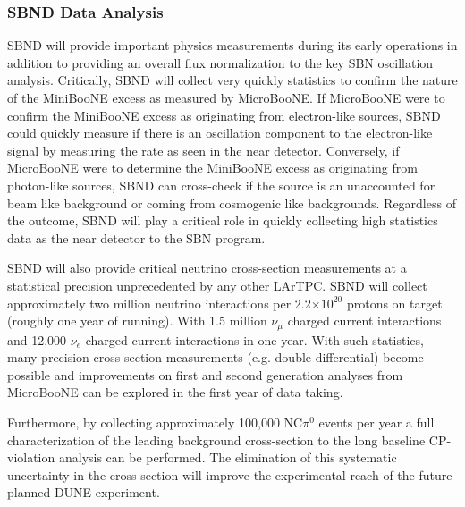 \subsubsection{SBND Data Analysis}\label{sec:SBNDBulid}
SBND will provide important physics measurements during its early operations in addition to providing an overall flux normalization to the key SBN oscillation analysis. Critically, SBND will collect very quickly statistics to confirm the nature of the MiniBooNE excess as measured by MicroBooNE. If MicroBooNE were to confirm the MiniBooNE excess as originating from electron-like sources, SBND could quickly measure if there is an oscillation component to the electron-like signal by measuring the rate as seen in the near detector. Conversely, if MicroBooNE were to determine the MiniBooNE excess as originating from photon-like sources, SBND can cross-check if the source is an unaccounted for beam like background or coming from cosmogenic like backgrounds. Regardless of the outcome, SBND will play a critical role in quickly collecting high statistics data as the near detector to the SBN program.

SBND will also provide critical neutrino cross-section measurements at a statistical precision unprecedented by any other LArTPC. SBND will collect approximately two million neutrino interactions per 2.2$\times 10^{20}$ protons  on target (roughly one year of running). With 1.5 million $\nu_{\mu}$ charged current interactions and 12,000 $\nu_{e}$ charged current interactions in one year. With such statistics, many precision cross-section measurements (e.g. double differential) become possible and improvements on first and second generation analyses from MicroBooNE can be explored in the first year of data taking.

Furthermore, by collecting approximately 100,000 NC$\pi^{0}$ events per year a full characterization of the leading background cross-section to the long baseline CP-violation analysis can be performed. The elimination of this systematic uncertainty in the cross-section will improve the experimental reach of the future planned DUNE experiment.
